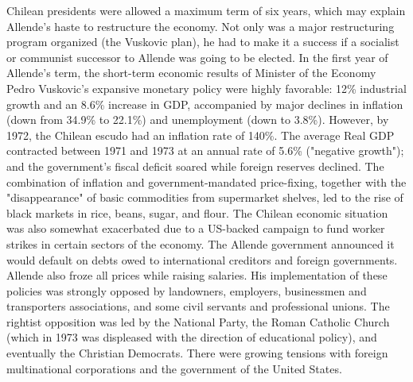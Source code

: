 Chilean presidents were allowed a maximum term of six years, which may
explain Allende's haste to restructure the economy. Not only was a major
restructuring program organized (the Vuskovic plan), he had to make it a
success if a socialist or communist successor to Allende was going to be
elected. In the first year of Allende's term, the short-term economic
results of Minister of the Economy Pedro Vuskovic's expansive monetary
policy were highly favorable: 12\% industrial growth and an 8.6\%
increase in GDP, accompanied by major declines in inflation (down from
34.9\% to 22.1\%) and unemployment (down to 3.8\%). However, by 1972,
the Chilean escudo had an inflation rate of 140\%. The average Real GDP
contracted between 1971 and 1973 at an annual rate of 5.6\% ("negative
growth"); and the government's fiscal deficit soared while foreign
reserves declined. The combination of inflation and government-mandated
price-fixing, together with the "disappearance" of basic commodities
from supermarket shelves, led to the rise of black markets in rice,
beans, sugar, and flour. The Chilean economic situation was also
somewhat exacerbated due to a US-backed campaign to fund worker strikes
in certain sectors of the economy. The Allende government announced it
would default on debts owed to international creditors and foreign
governments. Allende also froze all prices while raising salaries. His
implementation of these policies was strongly opposed by landowners,
employers, businessmen and transporters associations, and some civil
servants and professional unions. The rightist opposition was led by the
National Party, the Roman Catholic Church (which in 1973 was displeased
with the direction of educational policy), and eventually the Christian
Democrats. There were growing tensions with foreign multinational
corporations and the government of the United States.


